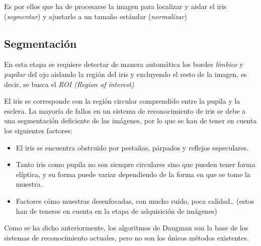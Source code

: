 Es por ellos que ha de procesarse la imagen para localizar y aislar el iris (\emph{segmentar}) y ajustarlo a un tamaño estándar (\emph{normalizar})


\subsection{Segmentación}
En esta etapa se requiere detectar de manera automática los bordes \emph{límbico} y \emph{pupilar} del ojo aislando la región del iris y excluyendo el resto de la imagen, es decir, se busca el \emph{ROI (Region of interest)}

El iris se corresponde con la región circular comprendido entre la pupila y la esclera.
La mayoría de fallos en un sistema de reconocimiento de iris se debe a una segmentación deficiente de las imágenes, por lo que se han de tener en cuenta los siguientes factores:
\begin{itemize}
    \item El iris se encuentra obstruido por pestañas, párpados y reflejos especulares.
    \item Tanto iris como pupila no son siempre circulares sino que pueden tener forma elíptica, y su forma puede variar dependiendo de la forma en que se tome la muestra.
    \item Factores cómo muestras desenfocadas, con mucho ruido, poca calidad.. (estos han de tenerse en cuenta en la etapa de adquisición de imágenes)
\end{itemize}

Como se ha dicho anteriormente, los algoritmos de Daugman son la base de los sistemas de reconocimiento actuales, pero no son los únicos métodos existentes.

